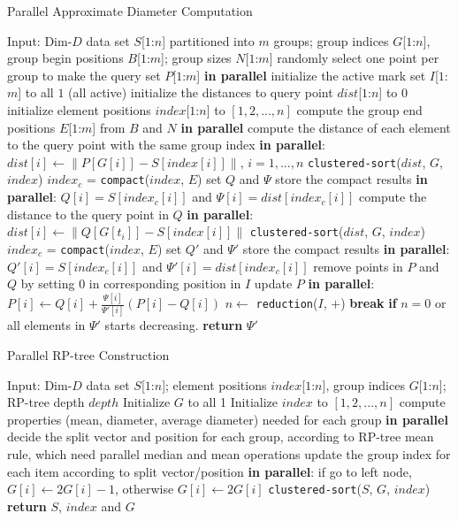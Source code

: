 \begin{algorithm}[htb]
    \caption{Parallel Approximate Diameter Computation}
    \label{algo:6:diameter-parallel}
    \begin{algorithmic}[1]
    \STATE Input: Dim-$D$ data set $S$[$1$:$n$] partitioned into $m$ groups; group indices $G$[$1$:$n$], group begin positions $B$[$1$:$m$]; group sizes $N$[$1$:$m$]
    \STATE randomly select one point per group to make the query set $P$[$1$:$m$] {\bf{in parallel}}
    \STATE initialize the active mark set $I$[$1$:$m$] to all $1$ (all active)
    \STATE initialize the distances to query point $dist$[$1$:$n$] to $0$
    \STATE initialize element positions $index$[$1$:$n$] to $[1,2,...,n]$
    \STATE compute the group end positions $E$[$1$:$m$] from $B$ and $N$ {\bf{in parallel}}
    \LOOP
        \STATE compute the distance of each element to the query point with the same group index {\bf{in parallel}}: $dist[i] \leftarrow \|P[G[i]] - S[index[i]]\|$, $i = 1,...,n$
        \STATE \texttt{clustered-sort}($dist$, $G$, $index$)
        \STATE $index_c$ = \texttt{compact}($index$, $E$)
        \STATE set $Q$ and $\Psi$ store the compact results {\bf{in parallel}}: $Q[i] = S[index_c[i]]$ and $\Psi[i] = dist[index_c[i]]$
        \STATE compute the distance to the query point in $Q$ {\bf{in parallel}}: $dist[i] \leftarrow \|Q[G[t_i]] - S[index[i]]\|$
        \STATE \texttt{clustered-sort}($dist$, $G$, $index$)
        \STATE $index_c$ = \texttt{compact}($index$, $E$)
        \STATE set $Q'$ and $\Psi'$ store the compact results {\bf{in parallel}}: $Q'[i] = S[index_c[i]]$ and $\Psi'[i] = dist[index_c[i]]$
        \STATE remove points in $P$ and $Q$ by setting $0$ in corresponding position in $I$
        \STATE update $P$ {\bf{in parallel}}: $P[i] \leftarrow Q[i] + \frac{\Psi[i]}{\Psi'[i]} (P[i] - Q[i])$
        \STATE $n \leftarrow$ \texttt{reduction}($I$, $+$)
        \STATE \textbf{break} \textbf{if} $n = 0$ or all elements in $\Psi'$ starts decreasing.
    \ENDLOOP
    \STATE \textbf{return} $\Psi'$
    \end{algorithmic}
\end{algorithm}

\begin{algorithm}[htb]
    \caption{Parallel RP-tree Construction}
    \label{algo:6:rptree-parallel}
    \begin{algorithmic}[1]
    \STATE Input: Dim-$D$ data set $S$[$1$:$n$]; element positions $index$[$1$:$n$], group indices $G$[$1$:$n$]; RP-tree depth $depth$
    \STATE Initialize $G$ to all 1
    \STATE Initialize $index$ to $[1,2,...,n]$
        \STATE compute properties (mean, diameter, average diameter) needed for each group {\bf{in parallel}}
        \STATE decide the split vector and position for each group, according to RP-tree mean rule, which need parallel median and mean operations
        \STATE update the group index for each item according to split vector/position {\bf{in parallel}}: if go to left node, $G[i] \leftarrow 2 G[i] - 1$, otherwise $G[i] \leftarrow 2 G[i]$
        \STATE \texttt{clustered-sort}($S$, $G$, $index$)
    \ENDFOR
    \STATE \textbf{return} $S$, $index$ and $G$
    \end{algorithmic}
\end{algorithm}

